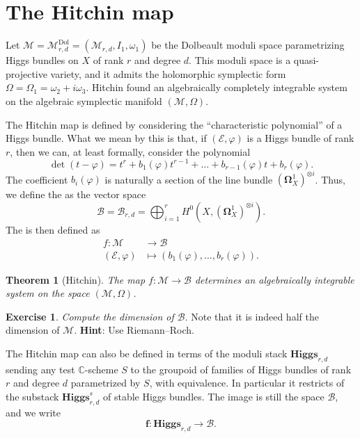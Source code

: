 \documentclass[12pt,a4paper]{amsbook}
\newtheorem{thm}{Theorem}[chapter]
\theoremstyle{remark} \newtheorem{rmk}[thm]{Remark}
\theoremstyle{definition} \newtheorem{defn}[thm]{Definition}
\theoremstyle{definition} \newtheorem{ex}[thm]{Example}
\theoremstyle{definition} \newtheorem{ej}{Exercise}
\let\emph\relax
\newcommand{\C}{\mathbb C}
\newcommand{\cB}{\mathcal B}
\newcommand{\cM}{\mathcal M}
\newcommand{\sE}{\mathscr E}
\newcommand{\Dol}{\mathrm{Dol}}
\begin{document}
\section{The Hitchin map}
Let $\cM=\cM^\Dol_{r,d}=(\cM_{r,d},I_1,\omega_1)$ be the Dolbeault moduli space parametrizing Higgs bundles on $X$ of rank $r$ and degree $d$. This moduli space is a quasi-projective variety, and it admits the holomorphic symplectic form $\Omega=\Omega_1=\omega_2+i\omega_3$. Hitchin \cite{Hitchin_Systems} found an algebraically completely integrable system on the algebraic symplectic manifold $(\cM,\Omega)$.

The Hitchin map is defined by considering the ``characteristic polynomial'' of a Higgs bundle. What we mean by this is that, if $(\sE,\varphi)$ is a Higgs bundle of rank $r$, then we can, at least formally, consider the polynomial
\begin{equation*}
\det(t - \varphi) = t^r + b_1(\varphi) t^{r-1} + \dots + b_{r-1}(\varphi) t + b_r(\varphi).
\end{equation*}
The coefficient $b_i(\varphi)$ is naturally a section of the line bundle $(\bm{\Omega}^1_X)^{\otimes i}$. Thus, we define the \emph{Hitchin base} as the vector space
\begin{equation*}
\cB = \cB_{r,d} = \bigoplus_{i=1}^r H^0(X,(\bm{\Omega}^1_X)^{\otimes i}).
\end{equation*}
The \emph{Hitchin map} is then defined as
\begin{align*}
  f: \cM & \longrightarrow \cB \\
(\sE,\varphi)    & \longmapsto (b_1(\varphi),\dots,b_r(\varphi)).
\end{align*}

\begin{thm}[Hitchin]
The map $f:\cM \rightarrow \cB$ determines an algebraically integrable system on the space $(\cM,\Omega)$.
\end{thm}

\begin{ej}
\textit{Compute the dimension of $\cB$}. Note that it is indeed half the dimension of $\cM$.  \textbf{Hint}: Use Riemann--Roch.
\end{ej}

The Hitchin map can also be defined in terms of the moduli stack $\mathbf{Higgs}_{r,d}$ sending any test $\C$-scheme $S$ to the groupoid of families of Higgs bundles of rank $r$ and degree $d$ parametrized by $S$, with equivalence. In particular it restricts of the substack $\mathbf{Higgs}^s_{r,d}$ of stable Higgs bundles. The image is still the space $\cB$, and we write
\begin{equation*}
\bm{f}: \mathbf{Higgs}_{r,d} \longrightarrow \cB.
\end{equation*}
\end{document}
